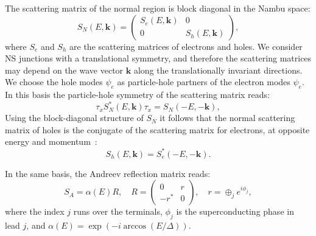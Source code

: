 \documentclass[twocolumn, notitlepage, 10pt, aps, floatfix, showpacs, prb, citeautoscript]{revtex4-1}
\newcommand{\pmat}[1]{\begin{pmatrix}#1\end{pmatrix}}
\newcommand{\comment}[1]{}
\begin{document}
\comment{Normal state scattering matrix.}
The scattering matrix of the normal region is block diagonal in the Nambu space:
\begin{equation}
S_N(E,\mathbf k)=\pmat{S_e(E,\mathbf k) & 0 \\
0 & S_h(E,\mathbf k)},
\end{equation}
where $S_e$ and $S_h$ are the scattering matrices of electrons and holes.
We consider NS junctions with a translational symmetry, and therefore the scattering matrices may depend on the wave vector $\mathbf k$ along the translationally invariant directions.
We choose the hole modes $\psi_e$ as particle-hole partners of the electron modes $\psi_e$.
In this basis the particle-hole symmetry of the scattering matrix reads:
\begin{equation}
\tau_x S^*_N(E,\mathbf k)\tau_x=S_N(-E,-\mathbf k),\label{eq:phs}
\end{equation}
Using the block-diagonal structure of $S_N$ it follows that the normal scattering matrix of holes is the conjugate of the scattering matrix for electrons, at opposite energy and momentum~\cite{Beenakker2015}:
\begin{equation}\label{phs}
S_h(E,\mathbf k)=S_e^*(-E,-\mathbf k).
\end{equation}

\comment{Andreev reflection matrix}
In the same basis, the Andreev reflection matrix reads:
\begin{equation}\label{areflmat}
S_A=\alpha(E)R,\quad R=\pmat{0 & r\\ -r^* & 0},
\quad r=\oplus_j e^{i\phi_j},
\end{equation}
where the index $j$ runs over the terminals, $\phi_j$ is the superconducting phase in lead $j$, and $\alpha(E)=\exp(-i\arccos(E/\Delta))$.~\cite{Beenakker1991}
\end{document}
